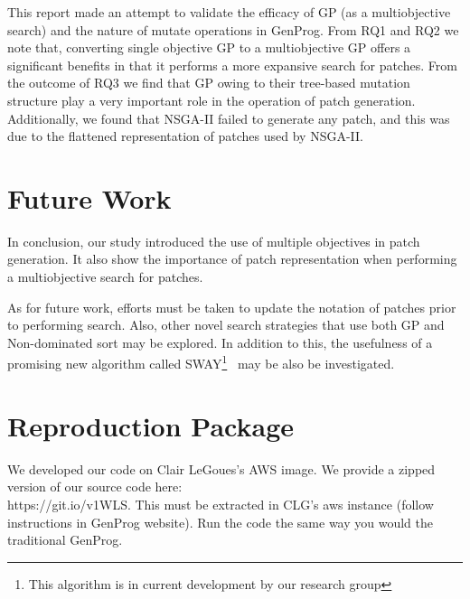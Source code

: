 \documentclass{sig-alternate}
\theoremstyle{break}
\begin{document}
This report made an attempt to validate the efficacy of GP (as a multiobjective search) and the nature of mutate operations in GenProg. From RQ1 and RQ2 we note that, converting single objective GP to a multiobjective GP offers a significant benefits in that it performs a more expansive search for patches. From the outcome of RQ3 we find that GP owing to their tree-based mutation structure play a very important role in the operation of patch generation. Additionally, we found that NSGA-II failed to generate any patch, and this was due to the flattened representation of patches used by NSGA-II.     

\section{Future Work}
\label{conclusions}
In conclusion, our study introduced the use of multiple objectives in patch generation. It also show the importance of patch representation when performing a multiobjective search for patches.

As for future work, efforts must be taken to update the notation of patches prior to performing search. Also, other novel search strategies that use both GP and Non-dominated sort may be explored. In addition to this, the usefulness of a promising new algorithm called SWAY\footnote{This algorithm is in current development by our research group}~\cite{chen2016sampling, nair2016accidental} may be also be investigated.
\section{Reproduction Package}

We developed our code on Clair LeGoues's AWS image. We provide a zipped version of our source code here:\\ https://git.io/v1WLS. This must be extracted in CLG's aws instance (follow instructions in GenProg website). Run the code the same way you would the traditional GenProg. 

\balance


\end{document}
